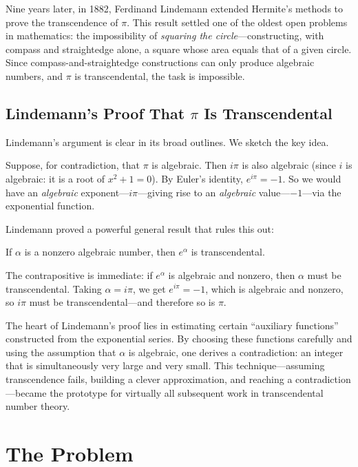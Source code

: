 Nine years later, in 1882, Ferdinand Lindemann extended Hermite's methods to prove the transcendence of $\pi$. This result settled one of the oldest open problems in mathematics: the impossibility of \emph{squaring the circle}---constructing, with compass and straightedge alone, a square whose area equals that of a given circle. Since compass-and-straightedge constructions can only produce algebraic numbers, and $\pi$ is transcendental, the task is impossible.

\subsection{Lindemann's Proof That \texorpdfstring{$\pi$}{pi} Is Transcendental}

Lindemann's argument is clear in its broad outlines. We sketch the key idea.

Suppose, for contradiction, that $\pi$ is algebraic. Then $i\pi$ is also algebraic (since $i$ is algebraic: it is a root of $x^2 + 1 = 0$). By Euler's identity, $e^{i\pi} = -1$. So we would have an \emph{algebraic} exponent---$i\pi$---giving rise to an \emph{algebraic} value---$-1$---via the exponential function.

Lindemann proved a powerful general result that rules this out:

\begin{theorem}[Lindemann, 1882]\label{thm:lindemann}
If $\alpha$ is a nonzero algebraic number, then $e^\alpha$ is transcendental.
\end{theorem}

The contrapositive is immediate: if $e^\alpha$ is algebraic and nonzero, then $\alpha$ must be transcendental. Taking $\alpha = i\pi$, we get $e^{i\pi} = -1$, which is algebraic and nonzero, so $i\pi$ must be transcendental---and therefore so is $\pi$.

The heart of Lindemann's proof lies in estimating certain ``auxiliary functions'' constructed from the exponential series. By choosing these functions carefully and using the assumption that $\alpha$ is algebraic, one derives a contradiction: an integer that is simultaneously very large and very small. This technique---assuming transcendence fails, building a clever approximation, and reaching a contradiction---became the prototype for virtually all subsequent work in transcendental number theory.

\section{The Problem}

